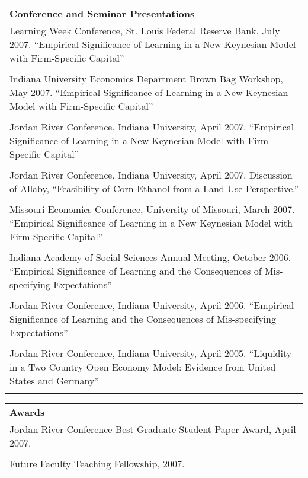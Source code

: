 \documentclass[12pt,notitlepage,oneside]{book}
\begin{document}
\begin{singlespace}
\begin{tabular}{p{5.5in}}
\textbf{Conference and Seminar Presentations} \\
Learning Week Conference, St. Louis Federal Reserve Bank, July 2007.\newline
\indent ``Empirical Significance of Learning in a New Keynesian Model with Firm-Specific Capital'' \\\\
Indiana University Economics Department Brown Bag Workshop, May 2007.\newline
\indent ``Empirical Significance of Learning in a New Keynesian Model with Firm-Specific Capital''\\\\
Jordan River Conference, Indiana University, April 2007.\newline
\indent ``Empirical Significance of Learning in a New Keynesian Model with Firm-Specific Capital''\\\\
Jordan River Conference, Indiana University, April 2007.\newline
\indent Discussion of Allaby, ``Feasibility of Corn Ethanol from a Land Use Perspective.''\\\\
Missouri Economics Conference, University of Missouri, March 2007.\newline
\indent ``Empirical Significance of Learning in a New Keynesian Model with Firm-Specific Capital''\\\\
Indiana Academy of Social Sciences Annual Meeting, October 2006.\newline
\indent ``Empirical Significance of Learning and the Consequences of Mis-specifying Expectations''\\\\
Jordan River Conference, Indiana University, April 2006.\newline
\indent ``Empirical Significance of Learning and the Consequences of Mis-specifying Expectations''\\\\
Jordan River Conference, Indiana University, April 2005.\newline
\indent ``Liquidity in a Two Country Open Economy Model: Evidence from United States and Germany''\\\\
\end{tabular} 

\begin{tabular}{p{5.5in}}
\textbf{Awards} \\
Jordan River Conference Best Graduate Student Paper Award, April 2007. \\\\
Future Faculty Teaching Fellowship, 2007. \\
\end{tabular} \\ \\


\end{singlespace}
\end{document}
